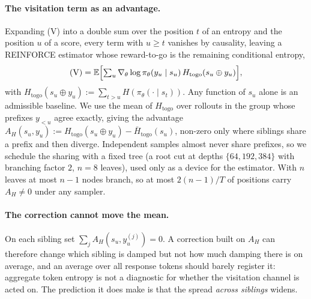 \documentclass[runningheads]{llncs}
\newcommand{\Htogo}{H_{\mathrm{togo}}}
\newcommand{\AH}{A_{H}}
\newcommand{\E}{\mathbb{E}}
\newcommand{\gradt}{\nabla_{\theta}}
\newcommand{\pit}{\pi_{\theta}}
\begin{document}
\paragraph{The visitation term as an advantage.} Expanding (V) into a double sum over
the position $t$ of an entropy and the position $u$ of a score, every term with
$u \ge t$ vanishes by causality, leaving a REINFORCE estimator whose reward-to-go is the
remaining conditional entropy,
\begin{equation}
(\mathrm{V}) = \E\Bigl[\textstyle\sum_u \gradt \log \pit(y_u \mid s_u)\,
\Htogo(s_u \oplus y_u)\Bigr],
\label{eq:togo}
\end{equation}
with $\Htogo(s_u \oplus y_u) := \sum_{t > u} H(\pit(\cdot \mid s_t))$. Any function of $s_u$ alone is an admissible baseline. We use the mean of $\Htogo$ over
rollouts in the group whose prefixes $y_{<u}$ agree exactly, giving the advantage
$\AH(s_u, y_u) := \Htogo(s_u \oplus y_u) - \bar{H}_{\mathrm{togo}}(s_u)$, non-zero only
where siblings share a prefix and then diverge. Independent samples almost never share
prefixes, so we schedule the sharing with a fixed tree (a root cut at depths
$\{64, 192, 384\}$ with branching factor $2$, $n = 8$ leaves), used only as a device
for the estimator. With $n$ leaves at most $n-1$ nodes branch, so at most $2(n-1)/T$ of
positions carry $\AH \ne 0$ under any sampler.

\paragraph{The correction cannot move the mean.}
\label{sec:zerosum}
On each sibling set $\sum_j \AH(s_u, y^{(j)}_u) = 0$. A correction built on $\AH$ can
therefore change which sibling is damped but not how much damping there is on
average, and an average over all response tokens should barely register it: aggregate
token entropy is not a diagnostic for whether the visitation channel is acted on. The
prediction it does make is that the spread \emph{across siblings} widens.
\end{document}
